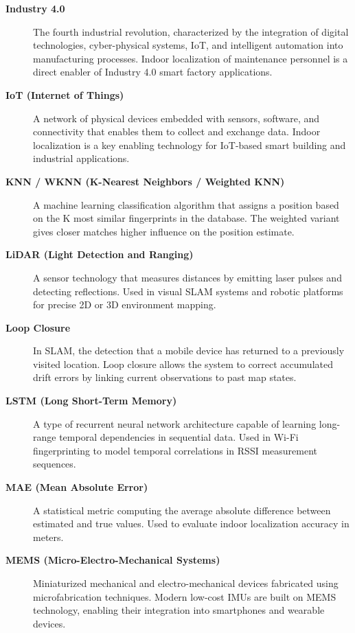 \documentclass{ipgpmaster}
\begin{document}
\begin{description}
\item[\textbf{Industry 4.0}]
The fourth industrial revolution, characterized by the integration of digital technologies, cyber-physical systems, IoT, and intelligent automation into manufacturing processes. Indoor localization of maintenance personnel is a direct enabler of Industry 4.0 smart factory applications.

\item[\textbf{IoT (Internet of Things)}]
A network of physical devices embedded with sensors, software, and connectivity that enables them to collect and exchange data. Indoor localization is a key enabling technology for IoT-based smart building and industrial applications.

\item[\textbf{KNN / WKNN (K-Nearest Neighbors / Weighted KNN)}]
A machine learning classification algorithm that assigns a position based on the K most similar fingerprints in the database. The weighted variant gives closer matches higher influence on the position estimate.

\item[\textbf{LiDAR (Light Detection and Ranging)}]
A sensor technology that measures distances by emitting laser pulses and detecting reflections. Used in visual SLAM systems and robotic platforms for precise 2D or 3D environment mapping.

\item[\textbf{Loop Closure}]
In SLAM, the detection that a mobile device has returned to a previously visited location. Loop closure allows the system to correct accumulated drift errors by linking current observations to past map states.

\item[\textbf{LSTM (Long Short-Term Memory)}]
A type of recurrent neural network architecture capable of learning long-range temporal dependencies in sequential data. Used in Wi-Fi fingerprinting to model temporal correlations in RSSI measurement sequences.

\item[\textbf{MAE (Mean Absolute Error)}]
A statistical metric computing the average absolute difference between estimated and true values. Used to evaluate indoor localization accuracy in meters.

\item[\textbf{MEMS (Micro-Electro-Mechanical Systems)}]
Miniaturized mechanical and electro-mechanical devices fabricated using microfabrication techniques. Modern low-cost IMUs are built on MEMS technology, enabling their integration into smartphones and wearable devices.


\end{description}
\end{document}
